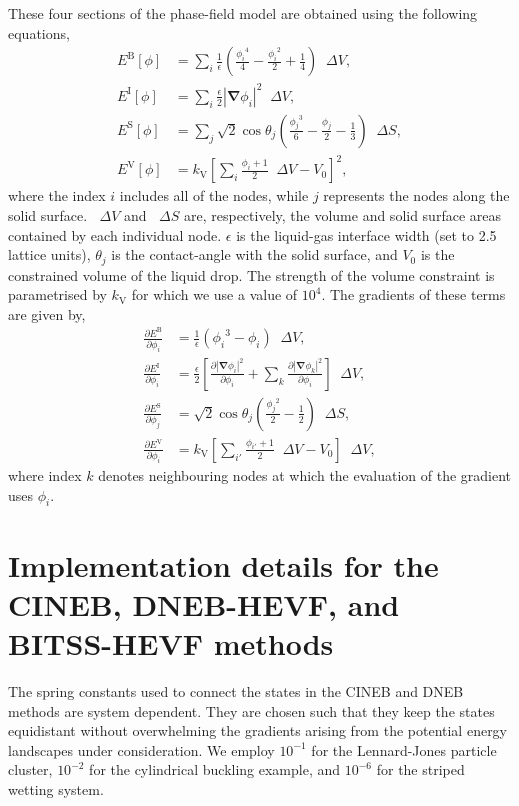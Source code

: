 \documentclass[aip,jcp,reprint,twocolumn]{revtex4-1}
\newcommand{\abs}[1]{\left| #1 \right|}
\newcommand{\grad}{\bm{\nabla}}
\newcommand{\upDelta}{\mathop{}\!\Delta}
\begin{document}
These four sections of the phase-field model are obtained using the following equations,
\begin{align}
  E^\mathrm{B}[\phi] &= \sum_i \frac{1}{\epsilon} \left( \frac{{\phi_i}^4}{4} - \frac{{\phi_i}^2}{2} + \frac{1}{4} \right) \upDelta V,\\
  E^\mathrm{I}[\phi] &= \sum_i \frac{\epsilon}{2} \abs{\grad \phi_i}^2 \upDelta V,\\
  E^\mathrm{S}[\phi] &= \sum_j \sqrt{2}\cos\theta_j \left( \frac{{\phi_j}^3}{6} - \frac{\phi_j}{2} - \frac{1}{3} \right) \upDelta S,\\
  E^\mathrm{V}[\phi] &= k_\mathrm{V} \left[ \sum_i \frac{\phi_i + 1}{2} \upDelta V - V_0 \right]^2,
\end{align}
where the index $i$ includes all of the nodes, while $j$ represents the nodes along the solid surface.
$\upDelta V$ and $\upDelta S$ are, respectively, the volume and solid surface areas contained by each individual node.
$\epsilon$ is the liquid-gas interface width (set to 2.5 lattice units), $\theta_j$ is the contact-angle with the solid surface, and $V_0$ is the constrained volume of the liquid drop.
The strength of the volume constraint is parametrised by $k_\mathrm{V}$ for which we use a value of $10^4$.
The gradients of these terms are given by,
\begin{align}
  \frac{\partial E^\mathrm{B}}{\partial \phi_i} &= \frac{1}{\epsilon} \left( {\phi_i}^3 - \phi_i \right) \upDelta V,\\
  \frac{\partial E^\mathrm{I}}{\partial \phi_i} &= \frac{\epsilon}{2} \left[
    \frac{\partial \abs{\grad \phi_i}^2}{\partial \phi_i} +
    \sum_k\frac{\partial \abs{\grad \phi_k}^2}{\partial \phi_i} \right] \upDelta V,\\
  \frac{\partial E^\mathrm{S}}{\partial \phi_j} &= \sqrt{2}\cos\theta_j \left( \frac{{\phi_j}^2}{2} - \frac{1}{2} \right) \upDelta S,\\
  \frac{\partial E^\mathrm{V}}{\partial \phi_i} &= k_\mathrm{V} \left[ \sum_{i'} \frac{\phi_{i'} + 1}{2} \upDelta V - V_0 \right] \upDelta V,
\end{align}
where index $k$ denotes neighbouring nodes at which the evaluation of the gradient uses $\phi_i$.

\section{Implementation details for the CINEB, DNEB-HEVF, and BITSS-HEVF methods}\label{sec:HEVFdetails}
The spring constants used to connect the states in the CINEB and DNEB methods are system dependent.
They are chosen such that they keep the states equidistant without overwhelming the gradients arising from the potential energy landscapes under consideration.
We employ $10^{-1}$ for the Lennard-Jones particle cluster, $10^{-2}$ for the cylindrical buckling example, and $10^{-6}$ for the striped wetting system.
\end{document}
